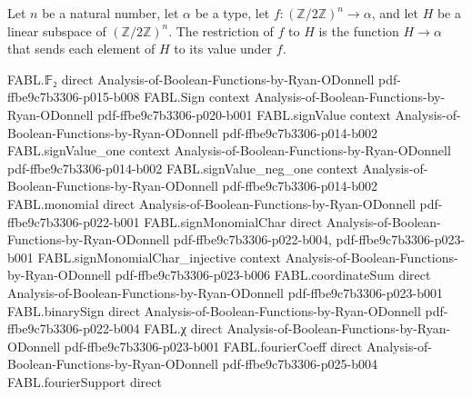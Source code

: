 \begin{definition}
\label{FABL.subspaceRestriction}
\leanok
{}
Let $n$ be a natural number, let $\alpha$ be a type, let
$f:(\mathbb{Z}/2\mathbb{Z})^n\to\alpha$, and let $H$ be a linear subspace of
$(\mathbb{Z}/2\mathbb{Z})^n$. The restriction of $f$ to $H$ is the function $H\to\alpha$
that sends each element of $H$ to its value under $f$.
\end{definition}

\begin{theorem}
\label{FABL.subspaceRestriction_apply}
\leanok
{}
\proofstep
  {FABL.𝔽₂}
  {direct}
  {Analysis-of-Boolean-Functions-by-Ryan-ODonnell}
  {pdf-ffbe9c7b3306-p015-b008}
\proofstep
  {FABL.Sign}
  {context}
  {Analysis-of-Boolean-Functions-by-Ryan-ODonnell}
  {pdf-ffbe9c7b3306-p020-b001}
\proofstep
  {FABL.signValue}
  {context}
  {Analysis-of-Boolean-Functions-by-Ryan-ODonnell}
  {pdf-ffbe9c7b3306-p014-b002}
\proofstep
  {FABL.signValue_one}
  {context}
  {Analysis-of-Boolean-Functions-by-Ryan-ODonnell}
  {pdf-ffbe9c7b3306-p014-b002}
\proofstep
  {FABL.signValue_neg_one}
  {context}
  {Analysis-of-Boolean-Functions-by-Ryan-ODonnell}
  {pdf-ffbe9c7b3306-p014-b002}
\proofstep
  {FABL.monomial}
  {direct}
  {Analysis-of-Boolean-Functions-by-Ryan-ODonnell}
  {pdf-ffbe9c7b3306-p022-b001}
\proofstep
  {FABL.signMonomialChar}
  {direct}
  {Analysis-of-Boolean-Functions-by-Ryan-ODonnell}
  {pdf-ffbe9c7b3306-p022-b004,
    pdf-ffbe9c7b3306-p023-b001}
\proofstep
  {FABL.signMonomialChar_injective}
  {context}
  {Analysis-of-Boolean-Functions-by-Ryan-ODonnell}
  {pdf-ffbe9c7b3306-p023-b006}
\proofstep
  {FABL.coordinateSum}
  {direct}
  {Analysis-of-Boolean-Functions-by-Ryan-ODonnell}
  {pdf-ffbe9c7b3306-p023-b001}
\proofstep
  {FABL.binarySign}
  {direct}
  {Analysis-of-Boolean-Functions-by-Ryan-ODonnell}
  {pdf-ffbe9c7b3306-p022-b004}
\proofstep
  {FABL.χ}
  {direct}
  {Analysis-of-Boolean-Functions-by-Ryan-ODonnell}
  {pdf-ffbe9c7b3306-p023-b001}
\proofstep
  {FABL.fourierCoeff}
  {direct}
  {Analysis-of-Boolean-Functions-by-Ryan-ODonnell}
  {pdf-ffbe9c7b3306-p025-b004}
\proofstep
  {FABL.fourierSupport}
  {direct}

\end{theorem}
